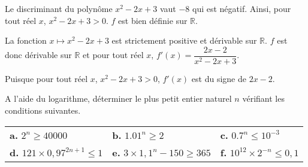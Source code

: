 \documentclass[11pt,fleqn, openany]{book} %
\begin{document}
\begin{solution}Le discriminant du polynôme $x^2-2x+3$ vaut $-8$ qui est négatif. Ainsi, pour tout réel $x$, $x^2-2x+3>0$. $f$ est bien définie sur $\mathbb{R}$.

La fonction $x\mapsto x^2-2x+3$ est strictement positive et dérivable sur $\mathbb{R}$. $f$ est donc dérivable sur $\mathbb{R}$ et pour tout réel $x$, $f'(x)=\dfrac{2x-2}{x^2-2x+3}$.

Puisque pour tout réel $x$, $x^2-2x+3>0$, $f'(x)$ est du signe de $2x-2$.

\begin{center}
\end{center}\end{solution}






\begin{exercise}[topic=log03]A l'aide du logarithme, déterminer le plus petit entier naturel $n$ vérifiant les conditions suivantes.
\vspace{-0.5cm}
\begin{center}
\begin{tabularx}{0.9\linewidth}{XXX}
\textbf{a.} $2^n \geqslant 40000$ & \textbf{b.} $1.01^n \geqslant 2$ & \textbf{c.} $0.7^n \leqslant 10^{-3}$\\
\textbf{d.} $121 \times 0,97^{2n+1} \leqslant 1$ &\textbf{e.}  $3 \times 1,1^n -150 \geqslant 365$ & \textbf{f.} $ 10^{12}\times 2^{-n} \leqslant 0,1$
\end{tabularx}
\end{center}\end{exercise}
\end{document}
